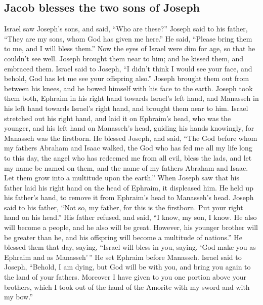 \hypertarget{jacob-blesses-the-two-sons-of-joseph}{%
\subsection{Jacob blesses the two sons of
Joseph}\label{jacob-blesses-the-two-sons-of-joseph}}

 Israel saw Joseph's sons, and said, ``Who are these?''
 Joseph said to his father, ``They are my sons, whom God
has given me here.'' He said, ``Please bring them to me, and I will
bless them.''  Now the eyes of Israel were dim for age,
so that he couldn't see well. Joseph brought them near to him; and he
kissed them, and embraced them.  Israel said to Joseph,
``I didn't think I would see your face, and behold, God has let me see
your offspring also.''  Joseph brought them out from
between his knees, and he bowed himself with his face to the earth.
 Joseph took them both, Ephraim in his right hand towards
Israel's left hand, and Manasseh in his left hand towards Israel's right
hand, and brought them near to him.  Israel stretched out
his right hand, and laid it on Ephraim's head, who was the younger, and
his left hand on Manasseh's head, guiding his hands knowingly, for
Manasseh was the firstborn.  He blessed Joseph, and said,
``The God before whom my fathers Abraham and Isaac walked, the God who
has fed me all my life long to this day,  the angel who
has redeemed me from all evil, bless the lads, and let my name be named
on them, and the name of my fathers Abraham and Isaac. Let them grow
into a multitude upon the earth.''  When Joseph saw that
his father laid his right hand on the head of Ephraim, it displeased
him. He held up his father's hand, to remove it from Ephraim's head to
Manasseh's head.  Joseph said to his father, ``Not so, my
father, for this is the firstborn. Put your right hand on his head.''
 His father refused, and said, ``I know, my son, I know.
He also will become a people, and he also will be great. However, his
younger brother will be greater than he, and his offspring will become a
multitude of nations.''  He blessed them that day,
saying, ``Israel will bless in you, saying, `God make you as Ephraim and
as Manasseh'\,'' He set Ephraim before Manasseh.  Israel
said to Joseph, ``Behold, I am dying, but God will be with you, and
bring you again to the land of your fathers.  Moreover I
have given to you one portion above your brothers, which I took out of
the hand of the Amorite with my sword and with my bow.''


